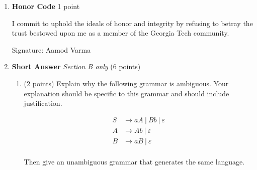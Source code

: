 \documentclass[11pt]{article}
\begin{document}
\begin{enumerate}

\item[0.] \textbf{Honor Code} 1 point

I commit to uphold the ideals of honor and integrity by refusing to betray the trust bestowed upon me as a member of the Georgia Tech community.

Signature: Aamod Varma

\item \textbf{Short Answer} \textit{Section B only} (6 points)
\begin{enumerate}
\item (2 points) Explain why the following grammar is ambiguous. Your explanation should be specific to this grammar and should include justification.

\begin{align*}
S & \rightarrow aA~|~Bb~|~\varepsilon\\
A & \rightarrow Ab ~|~ \varepsilon\\
B & \rightarrow aB ~|~ \varepsilon\\
\end{align*}

Then give an unambiguous grammar that generates the same language.

\begin{answer}

  


  


\end{answer}
\end{enumerate}
\end{enumerate}
\end{document}

